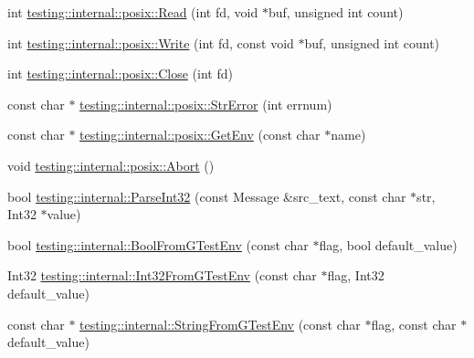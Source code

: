 \begin{DoxyCompactItemize}
\item 
int \hyperlink{namespacetesting_1_1internal_1_1posix_a3c6ab13e581a56f1b02f3eb7536c97fd}{testing\-::internal\-::posix\-::\-Read} (int fd, void $\ast$buf, unsigned int count)
\item 
int \hyperlink{namespacetesting_1_1internal_1_1posix_af4acf9f78d55f815a18b43786511abef}{testing\-::internal\-::posix\-::\-Write} (int fd, const void $\ast$buf, unsigned int count)
\item 
int \hyperlink{namespacetesting_1_1internal_1_1posix_a15e5b8f2a535ef1b2529b85b861e4846}{testing\-::internal\-::posix\-::\-Close} (int fd)
\item 
const char $\ast$ \hyperlink{namespacetesting_1_1internal_1_1posix_a6e7e77c37cacb64c32234b988b10933c}{testing\-::internal\-::posix\-::\-Str\-Error} (int errnum)
\item 
const char $\ast$ \hyperlink{namespacetesting_1_1internal_1_1posix_aa78973d3f7aa4efd24742b0537c8cd50}{testing\-::internal\-::posix\-::\-Get\-Env} (const char $\ast$name)
\item 
void \hyperlink{namespacetesting_1_1internal_1_1posix_a69b8278c59359dd6a6f941b4643db9fb}{testing\-::internal\-::posix\-::\-Abort} ()
\item 
bool \hyperlink{namespacetesting_1_1internal_ac06fc81336a3d80755f4020d34321766}{testing\-::internal\-::\-Parse\-Int32} (const Message \&src\-\_\-text, const char $\ast$str, Int32 $\ast$value)
\item 
bool \hyperlink{namespacetesting_1_1internal_a1055088bb9b867e1b7b8f096f519d7c5}{testing\-::internal\-::\-Bool\-From\-G\-Test\-Env} (const char $\ast$flag, bool default\-\_\-value)
\item 
Int32 \hyperlink{namespacetesting_1_1internal_ac2ea500678b361ecd2c03e4b02bb2ccf}{testing\-::internal\-::\-Int32\-From\-G\-Test\-Env} (const char $\ast$flag, Int32 default\-\_\-value)
\item 
const char $\ast$ \hyperlink{namespacetesting_1_1internal_a0967cbf18fb1594f82512d8d822aba21}{testing\-::internal\-::\-String\-From\-G\-Test\-Env} (const char $\ast$flag, const char $\ast$default\-\_\-value)
\end{DoxyCompactItemize}


